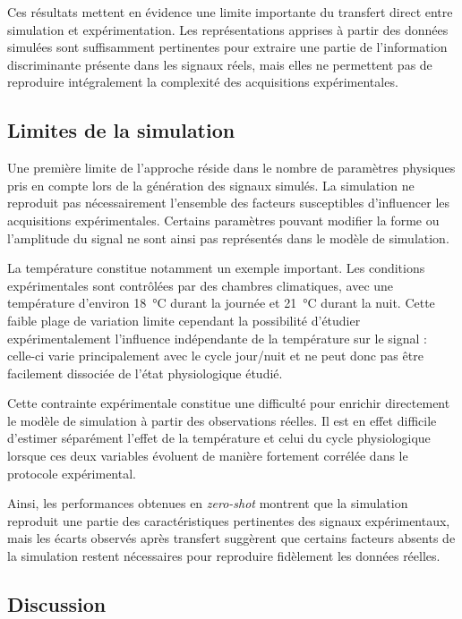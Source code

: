 \documentclass[12pt,a4paper,twoside]{article}
\begin{document}
Ces résultats mettent en évidence une limite importante du transfert direct entre simulation et expérimentation. Les représentations apprises à partir des données simulées sont suffisamment pertinentes pour extraire une partie de l'information discriminante présente dans les signaux réels, mais elles ne permettent pas de reproduire intégralement la complexité des acquisitions expérimentales.

\subsection{Limites de la simulation}
\label{subsec:limites_simul}

Une première limite de l'approche réside dans le nombre de paramètres physiques pris en compte lors de la génération des signaux simulés. La simulation ne reproduit pas nécessairement l'ensemble des facteurs susceptibles d'influencer les acquisitions expérimentales. Certains paramètres pouvant modifier la forme ou l'amplitude du signal ne sont ainsi pas représentés dans le modèle de simulation.

La température constitue notamment un exemple important. Les conditions expérimentales sont contrôlées par des chambres climatiques, avec une température d'environ \SI{18}{\degreeCelsius} durant la journée et \SI{21}{\degreeCelsius} durant la nuit. Cette faible plage de variation limite cependant la possibilité d'étudier expérimentalement l'influence indépendante de la température sur le signal : celle-ci varie principalement avec le cycle jour/nuit et ne peut donc pas être facilement dissociée de l'état physiologique étudié.

Cette contrainte expérimentale constitue une difficulté pour enrichir directement le modèle de simulation à partir des observations réelles. Il est en effet difficile d'estimer séparément l'effet de la température et celui du cycle physiologique lorsque ces deux variables évoluent de manière fortement corrélée dans le protocole expérimental.

Ainsi, les performances obtenues en \textit{zero-shot} montrent que la simulation reproduit une partie des caractéristiques pertinentes des signaux expérimentaux, mais les écarts observés après transfert suggèrent que certains facteurs absents de la simulation restent nécessaires pour reproduire fidèlement les données réelles.

\subsection{Discussion}
\label{subsec:discussion_simul}
\end{document}

